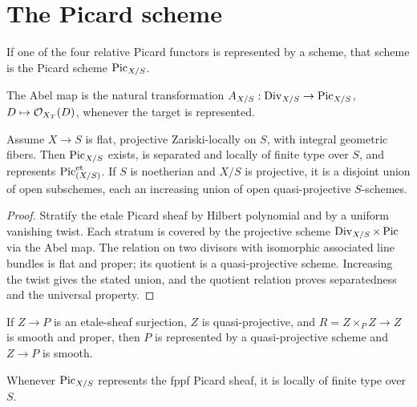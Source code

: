 \section{The Picard scheme}
\begin{definition}\label{fga-def-9-4-1}
If one of the four relative Picard functors is represented by a scheme, that
scheme is the Picard scheme $\operatorname{Pic}_{X/S}$.
\end{definition}
\begin{definition}\label{fga-def-9-4-6}
The Abel map is the natural transformation
$A_{X/S}:\operatorname{Div}_{X/S}\to\operatorname{Pic}_{X/S}$, $D\mapsto\mathcal O_{X_T}(D)$, whenever the
target is represented.
\end{definition}
\begin{theorem}\label{fga-thm-9-4-8}
Assume $X\to S$ is flat, projective Zariski-locally on $S$, with integral
geometric fibers.  Then $\operatorname{Pic}_{X/S}$ exists, is separated and locally of finite
type over $S$, and represents $\operatorname{Pic}_{(X/S)}^{\mathrm{et}}$.  If $S$ is
noetherian and $X/S$ is projective, it is a disjoint union of open subschemes,
each an increasing union of open quasi-projective $S$-schemes.
\end{theorem}
\begin{proof}
Stratify the etale Picard sheaf by Hilbert polynomial and by a uniform
vanishing twist.  Each stratum is covered by the projective scheme
$\operatorname{Div}_{X/S}\times\operatorname{Pic}$ via the Abel map.  The relation on two divisors with
isomorphic associated line bundles is flat and proper; its quotient is a
quasi-projective scheme.  Increasing the twist gives the stated union, and
the quotient relation proves separatedness and the universal property.
\end{proof}
\begin{lemma}\label{fga-lem-9-4-9}
If $Z\to P$ is an etale-sheaf surjection, $Z$ is quasi-projective, and
$R=Z\times_PZ\to Z$ is smooth and proper, then $P$ is represented by a
quasi-projective scheme and $Z\to P$ is smooth.
\end{lemma}
\begin{proposition}\label{fga-prop-9-4-17}
Whenever $\operatorname{Pic}_{X/S}$ represents the fppf Picard sheaf, it is locally of finite
type over $S$.
\end{proposition}
